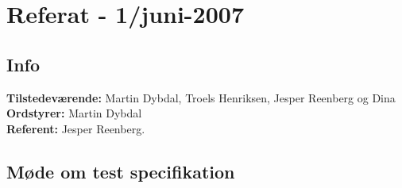 \documentclass[a4paper,10pt,draft]{article}
\begin{document}
\section{Referat - 1/juni-2007}

\subsection{Info}

\textbf{Tilstedeværende:} Martin Dybdal, Troels Henriksen, Jesper Reenberg og Dina\\
\textbf{Ordstyrer:} Martin Dybdal\\
\textbf{Referent:} Jesper Reenberg.

\subsection{Møde om test specifikation}
\end{document}

